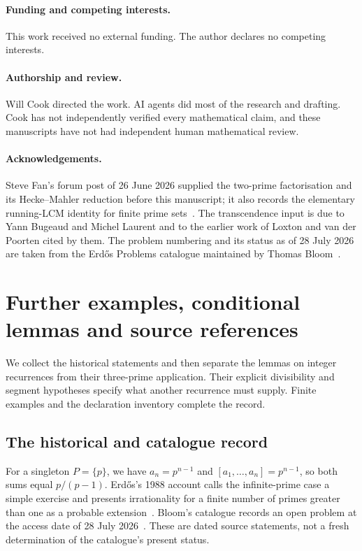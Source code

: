 \documentclass[11pt]{article}
\theoremstyle{remark}
\theoremstyle{plain}
\begin{document}
\paragraph{Funding and competing interests.} This work received no external
funding.  The author declares no competing interests.

\paragraph{Authorship and review.} Will Cook directed the work.  AI agents
did most of the research and drafting.  Cook has not independently
verified every mathematical claim, and these manuscripts have not had
independent human mathematical review.

\paragraph{Acknowledgements.}  Steve Fan's forum post of 26 June 2026 supplied the
two-prime factorisation and its Hecke--Mahler reduction before this
manuscript; it also records the elementary running-LCM identity for finite
prime sets~\cite{fan2026comment}.  The
transcendence input is due to Yann Bugeaud and Michel Laurent and to the
earlier work of Loxton and van der Poorten cited by them.  The
problem numbering and its status as of 28 July 2026 are taken from the
Erd\H{o}s Problems catalogue maintained by Thomas Bloom~\cite{erdosproblems}.
\section{Further examples, conditional lemmas and source references}
\label{long269:long:extended}

We collect the historical statements and then separate the lemmas on integer recurrences
from their three-prime application. Their explicit divisibility and
segment hypotheses specify what another recurrence must supply. Finite
examples and the declaration inventory complete the record.

\subsection{The historical and catalogue record}\label{long269:long:history}

For a singleton $P=\{p\}$, we have $a_n=p^{n-1}$ and
$[a_1,\ldots,a_n]=p^{n-1}$, so both sums equal $p/(p-1)$.
Erd\H{o}s's 1988 account calls the infinite-prime case a simple exercise
and presents irrationality for a finite number of primes greater than one
as a probable extension~\cite[p.~106]{erdos1988}.
Bloom's catalogue records an open problem at the access date of
28 July 2026~\cite{erdosproblems}. These are dated source statements,
not a fresh determination of the catalogue's present status.
\end{document}
